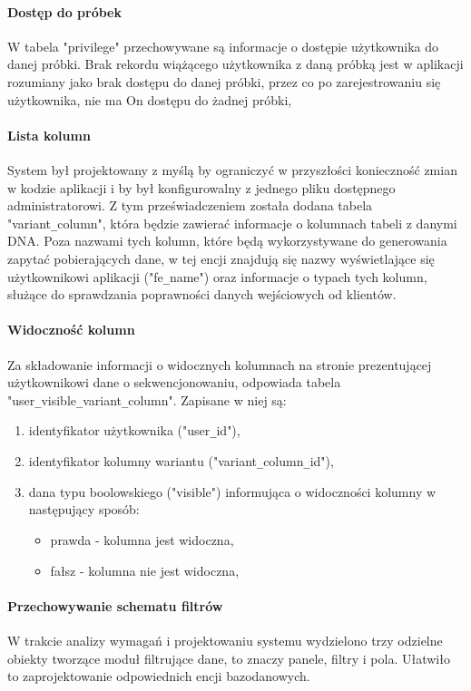 \documentclass[a4paper,12pt,twoside]{article}
\begin{document}
\paragraph{Dostęp do próbek} W tabela "privilege" przechowywane są informacje o 
dostępie użytkownika do danej próbki. Brak rekordu wiążącego użytkownika z 
daną próbką jest w aplikacji rozumiany jako brak dostępu do danej próbki,
przez co po zarejestrowaniu się użytkownika, nie ma On dostępu do żadnej próbki,

\paragraph{Lista kolumn} System był projektowany z myślą by ograniczyć w przyszłości konieczność zmian 
w kodzie aplikacji i by był konfigurowalny z jednego pliku dostępnego administratorowi.
Z tym przeświadczeniem została dodana tabela "variant\verb!_!column", która będzie zawierać
informacje o kolumnach tabeli z danymi DNA. Poza nazwami tych kolumn, które będą 
wykorzystywane do generowania zapytać pobierających dane, w tej encji znajdują
się nazwy wyświetlające się użytkownikowi aplikacji ("fe\verb!_!name") oraz informacje o typach
tych kolumn, służące do sprawdzania poprawności danych wejściowych od klientów.

\paragraph{Widoczność kolumn} Za składowanie informacji o widocznych kolumnach na
stronie prezentującej użytkownikowi dane o sekwencjonowaniu, odpowiada tabela \newline
"user\verb!_!visible\verb!_!variant\verb!_!column". Zapisane w niej są:
\begin{enumerate}[1)]
\item identyfikator użytkownika ("user\verb!_!id"),
\item identyfikator kolumny wariantu ("variant\verb!_!column\verb!_!id"),
\item dana typu boolowskiego ("visible") informująca o widoczności kolumny w następujący sposób:
\begin{itemize}
\item prawda - kolumna jest widoczna,
\item fałsz - kolumna nie jest widoczna,
\end{itemize}
\end{enumerate} 

\newpage
\paragraph{Przechowywanie schematu filtrów} W trakcie analizy wymagań i projektowaniu systemu wydzielono trzy odzielne obiekty tworzące moduł filtrujące dane, to znaczy panele, filtry i pola.
Ułatwiło to zaprojektowanie odpowiednich encji bazodanowych.
\end{document}
